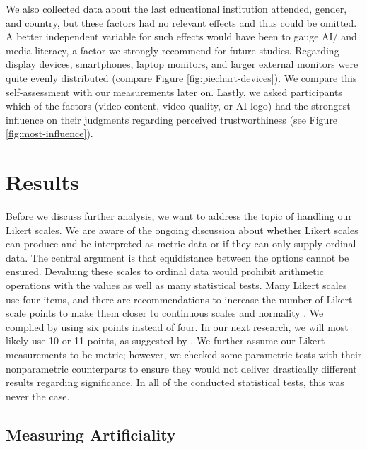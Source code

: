 \documentclass[
  a4paper,  %
  twoside,  %
  bibliography=totoc,
  headsepline,
  cleardoublepage=empty,
  parskip=half,
  draft=false
]{scrbook}
\begin{document}
We also collected data about the last educational institution attended, gender, and country, but these factors had no relevant effects and thus could be omitted. A better independent variable for such effects would have been to gauge AI/ and media-literacy, a factor we strongly recommend for future studies. Regarding display devices, smartphones, laptop monitors, and larger external monitors were quite evenly distributed (compare Figure \ref{fig:piechart-devices}). We compare this self-assessment with our measurements later on. Lastly, we asked participants which of the factors (video content, video quality, or AI logo) had the strongest influence on their judgments regarding perceived trustworthiness (see Figure \ref{fig:most-influence}).

\section{Results}
\label{sec:results}

Before we discuss further analysis, we want to address the topic of handling our Likert scales. We are aware of the ongoing discussion about whether Likert scales can produce and be interpreted as metric data or if they can only supply ordinal data. The central argument is that equidistance between the options cannot be ensured. Devaluing these scales to ordinal data would prohibit arithmetic operations with the values as well as many statistical tests. Many Likert scales use four items, and there are recommendations to increase the number of Likert scale points to make them closer to continuous scales and normality \cite{wuCanLikertScales2017a}. We complied by using six points instead of four. In our next research, we will most likely use 10 or 11 points, as suggested by . We further assume our Likert measurements to be metric; however, we checked some parametric tests with their nonparametric counterparts to ensure they would not deliver drastically different results regarding significance. In all of the conducted statistical tests, this was never the case.

\subsection{Measuring Artificiality}
\end{document}
